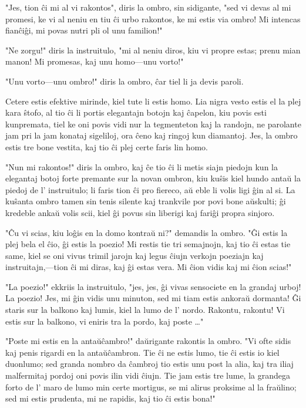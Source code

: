 "Jes, tion ĉi mi al vi rakontos", diris la ombro, sin sidigante, "sed vi devas al mi promesi, ke vi al neniu en tiu ĉi urbo rakontos, ke mi estis via ombro! Mi intencas fianĉiĝi, mi povas nutri pli ol unu familion!"

"Ne zorgu!" diris la instruitulo, "mi al neniu diros, kiu vi propre estas; prenu mian manon! Mi promesas, kaj unu homo---unu vorto!"

"Unu vorto---unu ombro!" diris la ombro, ĉar tiel li ja devis paroli.

Cetere estis efektive mirinde, kiel tute li estis homo. Lia nigra vesto estis el la plej kara ŝtofo, al tio ĉi li portis elegantajn botojn kaj ĉapelon, kiu povis esti kunpremata, tiel ke oni povis vidi nur la tegmenteton kaj la randojn, ne parolante jam pri la jam konataj sigeliloj, ora ĉeno kaj ringoj kun diamantoj. Jes, la ombro estis tre bone vestita, kaj tio ĉi plej certe faris lin homo.

"Nun mi rakontos!" diris la ombro, kaj ĉe tio ĉi li metis siajn piedojn kun la elegantaj botoj forte premante sur la novan ombron, kiu kuŝis kiel hundo antaŭ la piedoj de l' instruitulo; li faris tion ĉi pro fiereco, aŭ eble li volis ligi ĝin al si. La kuŝanta ombro tamen sin tenis silente kaj trankvile por povi bone aŭskulti; ĝi kredeble ankaŭ volis scii, kiel ĝi povus sin liberigi kaj fariĝi propra sinjoro.

"Ĉu vi scias, kiu loĝis en la domo kontraŭ ni?" demandis la ombro. "Ĝi estis la plej bela el ĉio, ĝi estis la poezio! Mi restis tie tri semajnojn, kaj tio ĉi estas tie same, kiel se oni vivus trimil jarojn kaj legus ĉiujn verkojn poeziajn kaj instruitajn,---tion ĉi mi diras, kaj ĝi estas vera. Mi ĉion vidis kaj mi ĉion scias!"

"La poezio!" ekkriis la instruitulo, "jes, jes, ĝi vivas sensociete en la grandaj urboj! La poezio! Jes, mi ĝin vidis unu minuton, sed mi tiam estis ankoraŭ dormanta! Ĝi staris sur la balkono kaj lumis, kiel la lumo de l' nordo. Rakontu, rakontu! Vi estis sur la balkono, vi eniris tra la pordo, kaj poste \ldots{}"

"Poste mi estis en la antaŭĉambro!" daŭrigante rakontis la ombro. "Vi ofte sidis kaj penis rigardi en la antaŭĉambron. Tie ĉi ne estis lumo, tie ĉi estis io kiel duonlumo; sed granda nombro da ĉambroj tio estis unu post la alia, kaj tra iliaj malfermitaj pordoj oni povis ilin vidi ĉiujn. Tie jam estis tre lume, la grandega forto de l' maro de lumo min certe mortigus, se mi alirus proksime al la fraŭlino; sed mi estis prudenta, mi ne rapidis, kaj tio ĉi estis bona!"

